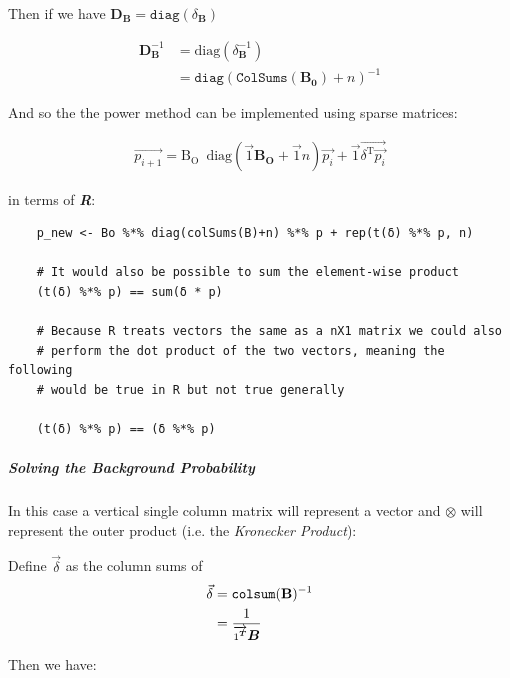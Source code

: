 \documentclass[11pt]{report}
\begin{document}
Then if we have \(\mathbf{D}_{\mathbf{B}} = \mathtt{diag}\left( \delta_{\mathbf{B}} \right)\)


   \begin{align}
	\mathbf{D}_{\mathbf{B}}^{-1} &= \mathrm{diag}\left( \delta_{\mathbf{B}}^{- 1} \right) \\
	&= \mathtt{diag} \left( \mathtt{ColSums \left( \mathbf{B_0} \right)} +  n \right)^{- 1}
\end{align}


And so the the power method can be implemented using sparse matrices:

\begin{align}
\vec{p_{i+1}} = \mathrm{B_{O}} \enspace \mathrm{diag}\left( \vec{1} \mathbf{B_{O}} + \vec{1}n \right) \vec{p_{i}} + \vec{1} \vec{\delta^{\mathrm{T}}\vec{p_{i}}}
\end{align}

in terms of \textbf{\emph{R}}:

\begin{tcolorbox}
    \begin{verbatim}
    p_new <- Bo %*% diag(colSums(B)+n) %*% p + rep(t(δ) %*% p, n)

    # It would also be possible to sum the element-wise product
    (t(δ) %*% p) == sum(δ * p)

    # Because R treats vectors the same as a nX1 matrix we could also
    # perform the dot product of the two vectors, meaning the following
    # would be true in R but not true generally

    (t(δ) %*% p) == (δ %*% p)
    \end{verbatim}
\end{tcolorbox}

\subparagraph{Solving the Background Probability}
\label{solve-background-prob-power-walk-sparse}
In this case a vertical single column matrix will represent a vector and \(\otimes\) will represent the outer product (i.e. the \emph{Kronecker Product}):



Define \(\vec{\delta}\) as the column sums of
\[\begin{aligned}
     \vec{\delta} & = \mathtt{colsum} (\text{{\bfseries{B}}})^{- 1}\\
     & = \frac{1}{\overrightarrow{1^{{\scriptsize \ensuremath{\boldsymbol{T}}}}}
     \ensuremath{\boldsymbol{B}}}
   \end{aligned}\]


Then we have:
\end{document}
